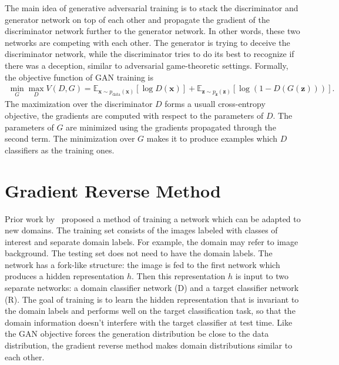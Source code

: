 \documentclass{article}
\begin{document}
    The main idea of generative adversarial
    training is to stack the discriminator and generator network on top of each other and propagate the gradient of the discriminator
    network further to the generator network. In other words, these two networks are competing with each other. The 
    generator is trying to deceive the discriminator network, while the discriminator tries
    to do its best to recognize if there was a deception, similar to adversarial game-theoretic settings.    
    Formally, the objective function of GAN training is
    \begin{align*}
        \min_G \max_D V(D, G) = \mathbb{E}_{\bm{x} \sim p_{\text{data}}(\bm{x})}[\log D(\bm{x})] + 
            \mathbb{E}_{\bm{z} \sim p_{\bm{z}}(\bm{z})}[\log (1 - D(G(\bm{z})))].
    \end{align*}
    The maximization over the discriminator $D$ forms a usuall cross-entropy objective, the gradients are
    computed with respect to the parameters of $D$. The parameters of $G$ are minimized using the gradients
    propagated through the second term. The minimization over $G$ makes it to produce examples which $D$
    classifiers as the training ones.
    
\section{Gradient Reverse Method}
\label{sec:gradient-reverse}

    Prior work by~\cite{ganin2014unsupervised} proposed a method of training a network 
    which can be adapted to new domains. The training set consists of the images
    labeled with classes of interest and separate domain labels. For example, the domain may refer to image background. The testing set does not need
    to have the domain labels. The network has a fork-like structure: the image is fed to the
    first network which produces a hidden representation $h$. Then this representation $h$ is input to two separate networks: a domain classifier network (D) and 
    a target classifier network (R). The goal of training is to learn the hidden 
    representation that is invariant to the domain labels and performs well on the target classification task, so that the domain information doesn't 
    interfere with the target classifier at test time. Like the GAN objective forces the generation distribution be close to the data distribution,
    the gradient reverse method makes domain distributions similar to each other.
\end{document}
